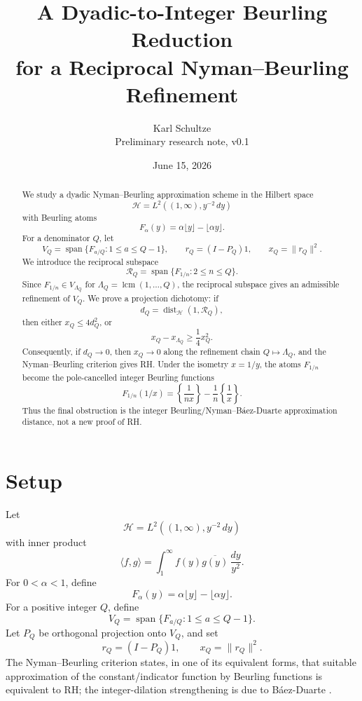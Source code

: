 \documentclass[11pt]{article}
\title{A Dyadic-to-Integer Beurling Reduction\\for a Reciprocal Nyman--Beurling Refinement}
\author{Karl Schultze\\\small Preliminary research note, v0.1}
\date{June 15, 2026}
\newcommand{\Hcal}{\mathcal H}
\newcommand{\Rcal}{\mathcal R}
\newcommand{\dist}{\operatorname{dist}}
\newcommand{\lcm}{\operatorname{lcm}}
\newcommand{\Span}{\operatorname{span}}
\begin{document}
\maketitle

\begin{center}
\end{center}

\begin{abstract}
We study a dyadic Nyman--Beurling approximation scheme in the Hilbert space
\[
\Hcal=L^2((1,\infty),y^{-2}\,dy)
\]
with Beurling atoms
\[
F_\alpha(y)=\alpha\lfloor y\rfloor-\lfloor \alpha y\rfloor.
\]
For a denominator $Q$, let
\[
V_Q=\Span\{F_{a/Q}:1\le a\le Q-1\},\qquad r_Q=(I-P_Q)1,\qquad x_Q=\|r_Q\|^2.
\]
We introduce the reciprocal subspace
\[
\Rcal_Q=\Span\{F_{1/n}:2\le n\le Q\}.
\]
Since $F_{1/n}\in V_{\Lambda_Q}$ for $\Lambda_Q=\lcm(1,\dots,Q)$, the reciprocal subspace gives an admissible refinement of $V_Q$. We prove a projection dichotomy: if
\[
d_Q=\dist_{\Hcal}(1,\Rcal_Q),
\]
then either $x_Q\le 4d_Q^2$, or
\[
x_Q-x_{\Lambda_Q}\ge \frac14 x_Q^2.
\]
Consequently, if $d_Q\to0$, then $x_Q\to0$ along the refinement chain $Q\mapsto \Lambda_Q$, and the Nyman--Beurling criterion gives RH. Under the isometry $x=1/y$, the atoms $F_{1/n}$ become the pole-cancelled integer Beurling functions
\[
F_{1/n}(1/x)=\left\{\frac1{nx}\right\}-\frac1n\left\{\frac1x\right\}.
\]
Thus the final obstruction is the integer Beurling/Nyman--Báez-Duarte approximation distance, not a new proof of RH.
\end{abstract}

\section{Setup}

Let
\[
\Hcal=L^2((1,\infty),y^{-2}\,dy)
\]
with inner product
\[
\langle f,g\rangle=\int_1^\infty f(y)\overline{g(y)}\,\frac{dy}{y^2}.
\]
For $0<\alpha<1$, define
\[
F_\alpha(y)=\alpha\lfloor y\rfloor-\lfloor \alpha y\rfloor.
\]
For a positive integer $Q$, define
\[
V_Q=\Span\{F_{a/Q}:1\le a\le Q-1\}.
\]
Let $P_Q$ be orthogonal projection onto $V_Q$, and set
\[
r_Q=(I-P_Q)1,\qquad x_Q=\|r_Q\|^2.
\]
The Nyman--Beurling criterion states, in one of its equivalent forms, that suitable approximation of the constant/indicator function by Beurling functions is equivalent to RH; the integer-dilation strengthening is due to Báez-Duarte \cite{baezduarte2003,baezduarte_arxiv}.
\end{document}

